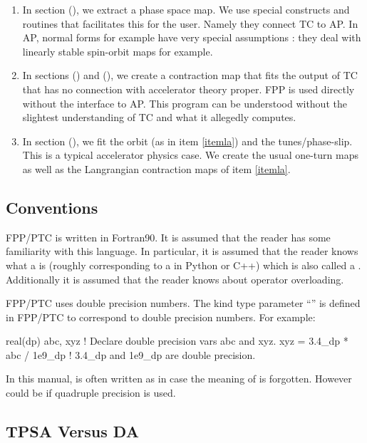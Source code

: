 \documentclass{hitec}     %
\begin{document}
 \begin{enumerate}
 \item In section (), we extract a phase space map.  We use special constructs  and routines  that facilitates this for the user. Namely they connect TC to AP. In AP, normal forms for example have very special assumptions : they deal with linearly stable spin-orbit maps for example.
 \item\label{itemla} In sections () and (), we create a contraction map that fits the output of TC  that has no connection with accelerator theory proper. FPP is used directly without the interface to AP. This program can be understood without the slightest understanding of TC and what it allegedly computes.
 \item In  section (), we fit the orbit (as in item \ref{itemla}) and the tunes/phase-slip. This is a typical accelerator physics case. We create the usual one-turn maps as well as the Langrangian contraction maps of item \ref{itemla}.
 \end{enumerate}
\subsection{Conventions}
\label{s:conventions}

FPP/PTC is written in Fortran90. It is assumed that the reader has some familiarity with this
language. In particular, it is assumed that the reader knows what a  is (roughly
corresponding to a  in Python or C++) which is also called a . Additionally it is
assumed that the reader knows about operator overloading.

FPP/PTC uses double precision numbers. The kind type parameter ``'' is defined in FPP/PTC to
correspond to double precision numbers.    For example:
\begin{code}
real(dp) abc, xyz             ! Declare double precision vars abc and xyz.
xyz = 3.4_dp * abc / 1e9_dp   ! 3.4_dp and 1e9_dp are double precision.
\end{code}

In this manual,  is often written as  in case the meaning of  is forgotten. However  could be  if quadruple precision is used.
\subsection{TPSA Versus DA}
\label{s:tpsa}
\end{document}
